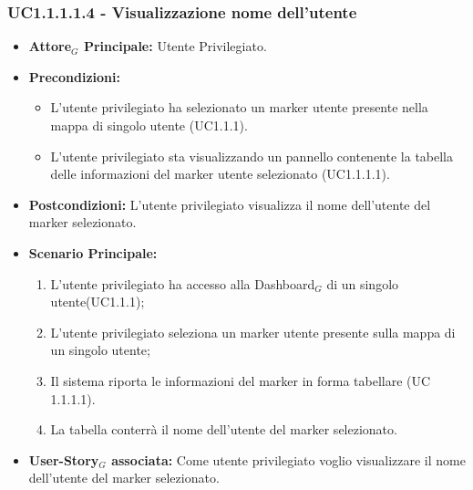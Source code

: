\documentclass[11pt]{article}
\begin{document}
\begin{justify}
\subsubsection{\textbf{UC1.1.1.1.4 - Visualizzazione nome dell'utente}}
\label{UC1.1.1.1.4}
\begin{itemize}
     \item \textbf{Attore$_G$ Principale:} Utente Privilegiato.
     \item \textbf{Precondizioni:}
        \begin{itemize}
          \item L'utente privilegiato ha selezionato un marker utente presente nella mappa di singolo utente (UC1.1.1).
          \item L'utente privilegiato sta visualizzando un pannello contenente la tabella delle informazioni del marker utente selezionato (UC1.1.1.1).
        \end{itemize}
      \item \textbf{Postcondizioni:} L'utente privilegiato visualizza il nome dell'utente del marker selezionato. 
      \item \textbf{Scenario Principale:}
        \begin{enumerate}
            \item L'utente privilegiato ha accesso alla Dashboard$_G$ di un singolo utente(UC1.1.1);
            \item L'utente privilegiato seleziona un marker utente presente sulla mappa di un singolo utente;
            \item Il sistema riporta le informazioni del marker in forma tabellare (UC 1.1.1.1).
            \item La tabella conterrà il nome dell'utente del marker selezionato.
        \end{enumerate}
     \item \textbf{User-Story$_G$ associata:}
       Come utente privilegiato voglio visualizzare il nome dell'utente del marker selezionato.
\end{itemize}


\end{justify}
\end{document}
